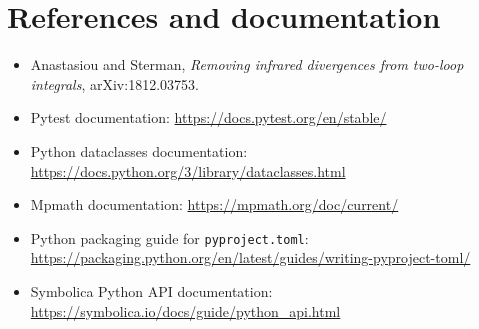 \documentclass[11pt,a4paper]{article}
\begin{document}
\section*{References and documentation}

\begin{itemize}
  \item Anastasiou and Sterman, \emph{Removing infrared divergences from two-loop integrals}, arXiv:1812.03753.
  \item Pytest documentation: \url{https://docs.pytest.org/en/stable/}
  \item Python dataclasses documentation: \url{https://docs.python.org/3/library/dataclasses.html}
  \item Mpmath documentation: \url{https://mpmath.org/doc/current/}
  \item Python packaging guide for \texttt{pyproject.toml}: \url{https://packaging.python.org/en/latest/guides/writing-pyproject-toml/}
  \item Symbolica Python API documentation: \url{https://symbolica.io/docs/guide/python_api.html}
\end{itemize}
\end{document}
